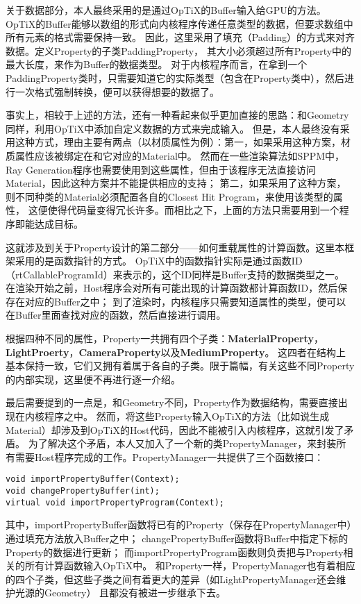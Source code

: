 关于数据部分，本人最终采用的是通过OpTiX的Buffer输入给GPU的方法。
OpTiX的Buffer能够以数组的形式向内核程序传递任意类型的数据，但要求数组中所有元素的格式需要保持一致。
因此，这里采用了填充（Padding）的方式来对齐数据。定义Property的子类PaddingProperty，
其大小必须超过所有Property中的最大长度，来作为Buffer的数据类型。
对于内核程序而言，在拿到一个PaddingProperty类时，只需要知道它的实际类型（包含在Property类中），然后进行一次格式强制转换，便可以获得想要的数据了。

事实上，相较于上述的方法，还有一种看起来似乎更加直接的思路：和Geometry同样，利用OpTiX中添加自定义数据的方式来完成输入。
但是，本人最终没有采用这种方式，理由主要有两点（以材质属性为例）：第一，如果采用这种方案，材质属性应该被绑定在和它对应的Material中。
然而在一些渲染算法如SPPM中，Ray Generation程序也需要使用到这些属性，但由于该程序无法直接访问Material，因此这种方案并不能提供相应的支持；
第二，如果采用了这种方案，则不同种类的Material必须配置各自的Closest Hit Program，来使用该类型的属性，
这便使得代码量变得冗长许多。而相比之下，上面的方法只需要用到一个程序即能达成目标。

这就涉及到关于Property设计的第二部分——如何重载属性的计算函数。这里本框架采用的是函数指针的方式。
OpTiX中的函数指针实际是通过函数ID（rtCallableProgramId）来表示的，这个ID同样是Buffer支持的数据类型之一。
在渲染开始之前，Host程序会对所有可能出现的计算函数都计算函数ID，然后保存在对应的Buffer之中；
到了渲染时，内核程序只需要知道属性的类型，便可以在Buffer里面查找对应的函数，然后直接进行调用。

根据四种不同的属性，Property一共拥有四个子类：\textbf{MaterialProperty}，\textbf{LightProerty}，\textbf{CameraProperty}以及\textbf{MediumProperty}。
这四者在结构上基本保持一致，它们又拥有着属于各自的子类。限于篇幅，有关这些不同Property的内部实现，这里便不再进行逐一介绍。

最后需要提到的一点是，和Geometry不同，Property作为数据结构，需要直接出现在内核程序之中。
然而，将这些Property输入OpTiX的方法（比如说生成Material）却涉及到OpTiX的Host代码，因此不能被引入内核程序，这就引发了矛盾。
为了解决这个矛盾，本人又加入了一个新的类PropertyManager，来封装所有需要Host程序完成的工作。PropertyManager一共提供了三个函数接口：

\lstset{language=C++}
\begin{lstlisting}
void importPropertyBuffer(Context);
void changePropertyBuffer(int);
virtual void importPropertyProgram(Context);
\end{lstlisting}

其中，importPropertyBuffer函数将已有的Property（保存在PropertyManager中）通过填充方法放入Buffer之中；
changePropertyBuffer函数将Buffer中指定下标的Property的数据进行更新；
而importPropertyProgram函数则负责把与Property相关的所有计算函数输入OpTiX中。
和Property一样，PropertyManager也有着相应的四个子类，但这些子类之间有着更大的差异（如LightPropertyManager还会维护光源的Geometry）
且都没有被进一步继承下去。

